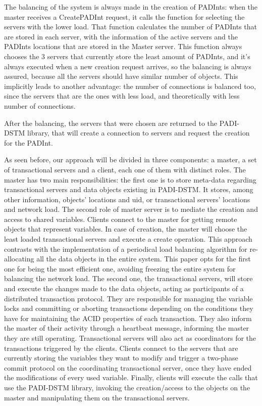 \documentclass[times, 10pt,twocolumn]{article}
\begin{document}

The balancing of the system is always made in the creation of PADInts: when the master receives a CreatePADInt request, it calls the function for selecting the servers with the lower load. That function calculates the number of PADInts that are stored in each server, with the information of the active servers and the PADInts locations that are stored in the Master server. This function always chooses the 3 servers that currently store the least amount of PADInts, and it's always executed when a new creation request arrives, so the balancing is always assured, because all the servers should have similar number of objects. This implicitly leads to another advantage: the number of connections is balanced too, since the servers that are the ones with less load, and theoretically with less number of connections.

After the balancing, the servers that were chosen are returned to the PADI-DSTM library, that will create a connection to servers and request the creation for the PADInt.


As seen before, our approach will be divided in three components: a master, a set of transactional servers and a client, each one of them with distinct roles.
The master has two main responsibilities: the first one is to store meta-data regarding transactional servers and data objects existing in PADI-DSTM. It stores, among other information, objects' locations and uid, or transactional servers' locations and network load. The second role of master server is to mediate the creation and access to shared variables. Clients connect to the master for getting remote objects that represent variables. In case of creation, the master will choose the least loaded transactional servers and execute a create operation. This approach contrasts with the implementation of a periodical load balancing algorithm for re-allocating all the data objects in the entire system. This paper opts for the first one for being the most efficient one, avoiding freezing the entire system for balancing the network load.
The second one, the transactional servers, will store and execute the changes made to the data objects, acting as participants of a distributed transaction protocol. They are responsible for managing the variable locks and committing or aborting transactions depending on the conditions they have for maintaining the ACID properties of each transaction. They also inform the master of their activity through a heartbeat message, informing the master they are still operating. Transactional servers will also act as coordinators for the transactions triggered by the clients. Clients connect to the servers that are currently storing the variables they want to modify and trigger a two-phase commit protocol on the coordinating transactional server, once they have ended the modifications of every used variable.
Finally, clients will execute the calls that use the PADI-DSTM library, invoking the creation/access to the objects on the master and manipulating them on the transactional servers.
\end{document}
